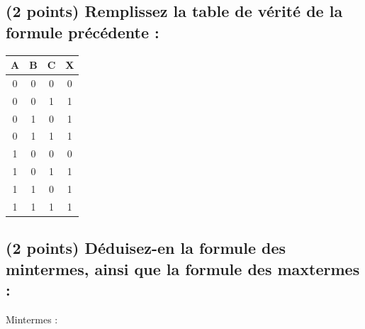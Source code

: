 \documentclass[11pt,a4paper]{article}
\begin{document}
\begin{table}[!ht]
  \centering
  \begin{minipage}{0.50\textwidth}
    \centering

\subsection{(2 points) Remplissez la table de vérité de la formule précédente : }

\bigskip

\begin{center}
\begin{tabular}{|c|c|c||c|}
\hline
\cellcolor{black!15} \textbf{A} & \cellcolor{black!15} \textbf{B} & \cellcolor{black!15} \textbf{C}  &  \cellcolor{black!15} \textbf{X} \\
\hline
\hline
0 & 0 & 0  &  \cellcolor{black!15} 0 \\ \hline
0 & 0 & 1  &  \cellcolor{black!15} 1 \\ \hline
0 & 1 & 0  &  \cellcolor{black!15} 1 \\ \hline
0 & 1 & 1  &  \cellcolor{black!15} 1 \\ \hline
1 & 0 & 0  &  \cellcolor{black!15} 0 \\ \hline
1 & 0 & 1  &  \cellcolor{black!15} 1 \\ \hline
1 & 1 & 0  &  \cellcolor{black!15} 1 \\ \hline
1 & 1 & 1  &  \cellcolor{black!15} 1 \\ \hline
\end{tabular}
\end{center}

\vspace*{1.0cm}

\vspace*{1.0cm}



  \end{minipage}
  \hfillx
  \begin{minipage}{0.50\textwidth}


\subsection{(2 points) Déduisez-en la formule des mintermes, ainsi que la formule des maxtermes : }

\bigskip

Mintermes :


\end{minipage}
\end{table}
\end{document}
